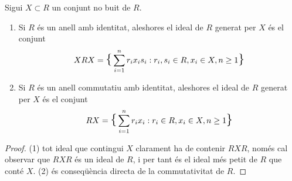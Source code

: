 \begin{lema} Sigui $X\subset R$ un conjunt no buit de $R$.
\begin{enumerate}[(1)]
\item Si $R$ és un anell amb identitat, aleshores el ideal de $R$ generat per $X$ és el conjunt
$$
XRX= \scalebox{1.5}{\{}  \sum_{i=1}^n r_i x_i s_i : r_i ,s_i \in R , x_i\in X, n \geq 1 \scalebox{1.5}{\}} 
$$
\item Si $R$ és un anell commutatiu amb identitat, aleshores el ideal de $R$ generat per $X$ és el conjunt 
$$
RX= \scalebox{1.5}{\{}  \sum_{i=1}^n r_i x_i : r_i  \in R , x_i\in X, n \geq 1 \scalebox{1.5}{\}} 
$$
\end{enumerate}
\end{lema} 
\begin{proof} (1) tot ideal que contingui $X$ clarament ha de contenir $RXR$, només cal observar que $RXR$ és un ideal de $R$, i per tant és el ideal més petit de $R$ que conté $X$. (2) és conseqüència directa de la commutativitat de $R$.
\end{proof}

